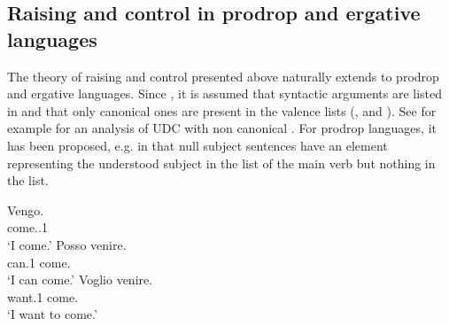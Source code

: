 \documentclass[output=paper
	        ,collection
	        ,collectionchapter
 	        ,biblatex
                ,babelshorthands
                ,newtxmath
                ,draftmode
                ,colorlinks, citecolor=brown
]{langscibook}
\begin{document}



\subsection{Raising and control in prodrop and ergative languages}
The theory of raising and control presented above naturally extends to prodrop and ergative languages. 
Since \citet{BMS2001a}, it is assumed that syntactic arguments are listed in \argst and that only
canonical ones are present in the valence lists (\subj, \spr and \comps). See for example  for an analysis of UDC with non canonical \synsem . For prodrop languages, it
has been proposed, e.g. in \citep[]{ManningandSag1998} that null subject sentences have an element representing the understood subject in the \argst list of the main verb but nothing in the \subj list. 

\eal
\ex 
\label{Italian}
\gll Vengo.\\
     come.\PRS.1\SG\\
\glt `I come.'
\ex 
\label{Italian-raising}
\gll Posso venire.\\
     can.1\SG{} come.\INF\\
\glt `I can come.'
\ex 
\label{Italian-control}
\gll Voglio venire.\\ 
     want.1\SG{} come.\INF\\
\glt `I want to come.'
\zl
\end{document}
